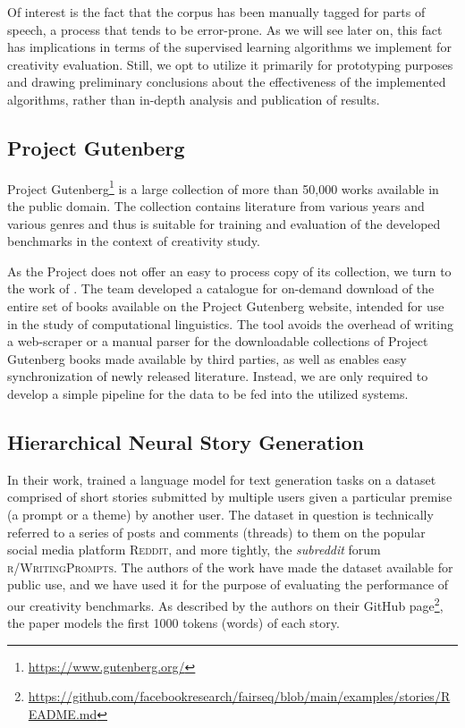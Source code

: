Of interest is the fact that the corpus has been manually tagged for parts of speech, a process that tends to be error-prone. %
As we will see later on, this fact has implications in terms of the supervised learning algorithms we implement for creativity evaluation. Still, we opt to utilize it primarily for prototyping purposes and drawing preliminary conclusions about the effectiveness of the implemented algorithms, rather than in-depth analysis and publication of results.

\subsection{Project Gutenberg}
Project Gutenberg\footnote[1]{\url{https://www.gutenberg.org/}} is a large collection of more than 50,000 works available in the public domain. The collection contains literature from various years and various genres and thus is suitable for training and evaluation of the developed benchmarks in the context of creativity study. 

As the Project does not offer an easy to process copy of its collection, we turn to the work of \cite{gutenberg_dataset}. The team developed a catalogue for on-demand download of the entire set of books available on the Project Gutenberg website, intended for use in the study of computational linguistics. The tool avoids the overhead of writing a web-scraper or a manual parser for the downloadable collections of Project Gutenberg books made available by third parties, as well as enables easy synchronization of newly released literature. Instead, we are only required to develop a simple pipeline for the data to be fed into the utilized systems. 

\subsection{Hierarchical Neural Story Generation}
In their work, \cite{fan_hierarchical_2018} trained a language model for text generation tasks on a dataset comprised of short stories submitted by multiple users given a particular premise (a prompt or a theme) by another user.  The dataset in question is technically referred to a series of posts and comments (threads) to them on the popular social media platform \textsc{Reddit}, and more tightly, the \textit{subreddit} forum \textsc{r/WritingPrompts}. The authors of the work \cite{fan_hierarchical_2018} have made the dataset available for public use, and we have used it for the purpose of evaluating the performance of our creativity benchmarks. As described by the authors on their GitHub page\footnote{\url{https://github.com/facebookresearch/fairseq/blob/main/examples/stories/README.md}}, the paper models the first 1000 tokens (words) of each story.

